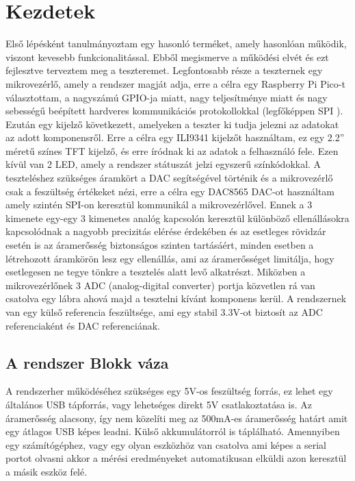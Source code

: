 \section{Kezdetek}

Első lépésként tanulmányoztam egy hasonló terméket, amely hasonlóan működik, 
viszont kevesebb funkcionalitással. Ebből megismerve a működési elvét és ezt fejlesztve 
terveztem meg a teszteremet. Legfontosabb része a teszternek egy mikrovezérlő, 
amely a rendszer magját adja, erre a célra egy Raspberry Pi Pico-t \cite{RaspberryPico} 
választottam, a nagyszámú GPIO-ja miatt, nagy teljesítménye miatt és nagy sebességű 
beépített hardveres kommunikációs protokollokkal (legfőképpen SPI \cite{SPIprotokol}). 
Ezután egy kijelző következett, amelyeken a teszter ki tudja jelezni az adatokat az adott 
komponensről. Erre a célra egy ILI9341 \cite{ILI9341Datasheet} kijelzőt használtam, ez 
egy 2.2” méretű színes TFT kijelző, és erre íródnak ki az adatok a felhasználó fele. 
Ezen kívül van 2 LED, amely a rendszer státuszát jelzi egyszerű színkódokkal. A teszteléshez 
szükséges áramkört a DAC segítségével történik és a mikrovezérlő csak a feszültség 
értékeket nézi, erre a célra egy DAC8565 \cite{DAC} DAC-ot használtam amely szintén 
SPI-on keresztül kommunikál a mikrovezérlővel. Ennek a 3 kimenete egy-egy 3 kimenetes 
analóg kapcsolón\cite{AnalogSwitch} keresztül különböző ellenállásokra kapcsolódnak a nagyobb precizitás 
elérése érdekében és az esetleges rövidzár esetén is az áramerősség biztonságos szinten 
tartásáért, minden esetben a létrehozott áramkörön lesz egy ellenállás, ami az 
áramerősséget limitálja, hogy esetlegesen ne tegye tönkre a tesztelés alatt levő 
alkatrészt. Miközben a mikrovezérlőnek 3 ADC (analog-digital converter) portja közvetlen 
rá van csatolva egy lábra ahová majd a tesztelni kívánt komponens kerül. A rendszernek 
van egy külső referencia feszültsége, ami egy stabil 3.3V-ot biztosít az ADC referenciaként 
és DAC referenciának.

\subsection{A rendszer Blokk váza}

A rendszerher működéséhez szükséges egy 5V-os feszültség forrás, ez lehet egy általános USB
tápforrás, vagy lehetséges direkt 5V csatlakoztatása is. Az áramerősség alacsony, így nem közelíti
meg az 500mA-es áramerősség határt amit egy átlagos USB képes leadni. Külső akkumulátorról
is táplálható. Amennyiben egy számítógéphez, vagy egy olyan eszközhöz van csatolva ami képes 
a serial portot olvasni akkor a mérési eredményeket automatikusan elküldi azon keresztül a 
másik eszköz felé. 

